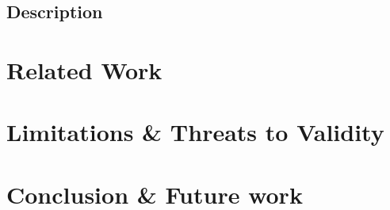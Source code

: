 \documentclass[runningheads]{llncs}
\begin{document}
\subsection{Description}
\cite{camundaservicesgmbhBpmnjs2024}

\section{Related Work}


\cite{krauterFormalizationAnalysisBPMN2023,krauterHigherorderTransformationApproach2023}

\cite{vangorpVisualTokenbasedFormalization2013}

\cite{corradiniBProVeToolSupport2017,corradiniFormalApproachAnalysis2021}

\cite{houhouFirstOrderLogicSemantics2019,houhouFirstOrderLogicVerification2022}

\section{Limitations \& Threats to Validity}



\section{Conclusion \& Future work}



\end{document}

